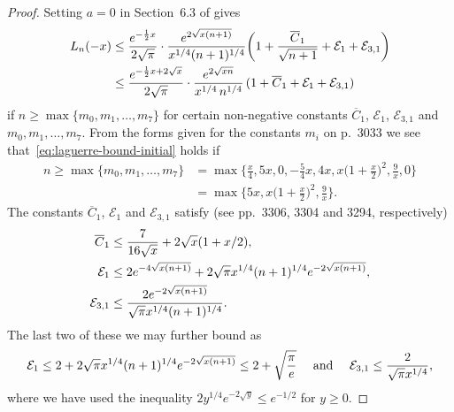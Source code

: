 \documentclass{mcom-l}
\numberwithin{equation}{section}
\numberwithin{theorem}{section} %
\begin{document}
\begin{proof}
  Setting $a = 0$ in Section~6.3 of \cite{Borwein2008} gives
  \begin{equation} \label{eq:laguerre-bound-initial}
    \begin{split}
      L_n(-x) &\leq \frac{e^{-\frac{1}{2} x}}{2\sqrt{\pi}} \cdot \frac{e^{2\sqrt{\smash[b]{x (n+1)}}}}{x^{1/4} (n + 1)^{1/4}}\bigg(1 + \frac{\overline{C}_1}{\sqrt{n+1}} + \mathcal{E}_1 + \mathcal{E}_{3,1} \bigg) \\
      &\leq \frac{e^{-\frac{1}{2} x + 2\sqrt{\smash[b]{x}}}}{2\sqrt{\pi}} \cdot \frac{e^{2\sqrt{\smash[b]{x n}}}}{x^{1/4} \, n^{1/4}} \, (1 + \overline{C}_1 + \mathcal{E}_1 + \mathcal{E}_{3,1} )
      \end{split}
  \end{equation}
  if $n \geq \max\{m_0, m_1, \ldots, m_7\}$ for certain non-negative constants $\overline{C}_1$, $\mathcal{E}_1$, $\mathcal{E}_{3,1}$ and $m_0, m_1, \ldots, m_7$.
  From the forms given for the constants $m_i$ on p.\@~3033 we see that~\eqref{eq:laguerre-bound-initial} holds if
  \begin{equation*}
    \begin{split}
      n \geq \max\{m_0, m_1, \ldots, m_7\} &= \max\bigg\{ \frac{x}{4}, 5x, 0, -\frac{5}{4} x, 4x, x\bigg(1+ \frac{x}{2} \bigg)^2, \frac{9}{x}, 0 \bigg\} \\
      &= \max\bigg\{ 5x, x\bigg(1+\frac{x}{2} \bigg)^2, \frac{9}{x} \bigg\}.
      \end{split}
  \end{equation*}
  The constants $\overline{C}_1$, $\mathcal{E}_1$ and $\mathcal{E}_{3,1}$ satisfy (see pp.\@~3306, 3304 and 3294, respectively)
  \begin{align*}
    \overline{C}_1 &\leq \frac{7}{16 \sqrt{x}} + 2 \sqrt{x} (1 + x / 2) , \\
    \mathcal{E}_1 &\leq 2 e^{-4 \sqrt{\smash[b]{x(n+1)}}} + 2\sqrt{\pi} x^{1/4} (n+1)^{1/4} e^{-2 \sqrt{\smash[b]{x(n+1)}}}, \\
    \mathcal{E}_{3, 1} &\leq \frac{2 e^{-2 \sqrt{\smash[b]{x(n+1)}}} }{\sqrt{\pi} x^{1/4} (n+1)^{1/4}}.
  \end{align*}
  The last two of these we may further bound as
  \begin{equation*}
    \mathcal{E}_1 \leq 2 + 2\sqrt{\pi} x^{1/4} (n+1)^{1/4} e^{-2 \sqrt{\smash[b]{x (n+1)}}} \leq 2 + \sqrt{\frac{\pi}{e}} \quad \text{ and } \quad \mathcal{E}_{3,1} \leq \frac{2}{\sqrt{\pi} x^{1/4}},
  \end{equation*}
  where we have used the inequality $2y^{1/4} e^{-2 \sqrt{y}} \leq e^{-1/2}$ for $y \geq 0$.
\end{proof}
\end{document}
